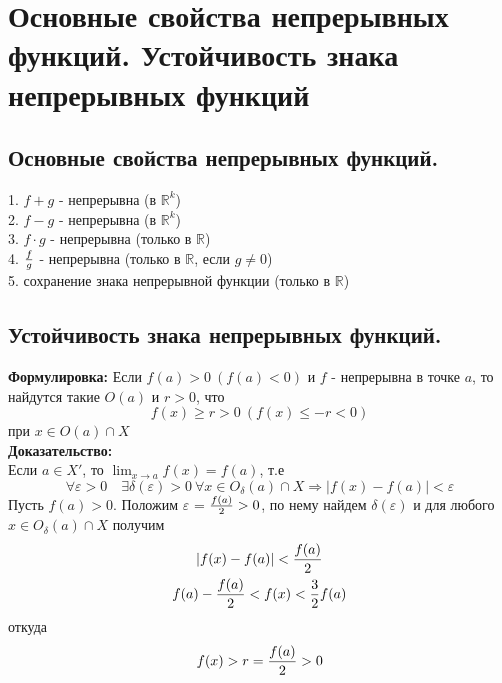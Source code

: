\section{Основные свойства непрерывных функций. Устойчивость знака непрерывных функций}
\subsection{Основные свойства непрерывных функций.}
1. $f + g$ - непрерывна (в $\mathbb{R}^{k}$)\\
2. $f - g$ - непрерывна (в $\mathbb{R}^{k}$)\\
3. $f \cdot g$ - непрерывна (только в $\mathbb{R}$)\\
4. $f \over g$ - непрерывна (только в $\mathbb{R}$, если $g \neq 0 $) \\
5. сохранение знака непрерывной функции (только в $\mathbb{R}$)

\subsection{Устойчивость знака непрерывных функций.}
\textbf{Формулировка:}
Если $f(a) > 0 \ (f(a) < 0 )$ и $f$ - непрерывна в точке $a$, то найдутся такие $O(a)$ и $r>0$, что\\
$$
	f(x) \geq r > 0 \ (f(x) \leq -r < 0)
$$
при $x \in O(a) \cap X$\\
\textbf{Доказательство:}\\
Если $a \in X'$, то $\lim_{x\to a}{f(x)} = f(a)$, т.е
$$
\forall \varepsilon>0 \quad \exists \delta(\varepsilon)>0 \ \forall x \in O_{\delta}(a) \cap X
\Rightarrow |f(x)- f(a)| < \varepsilon
$$
Пусть $f(a)>0$. Положим $\varepsilon$ = ${f(a)\over 2} > 0$, по нему найдем $\delta(\varepsilon)$ и для любого $x \in O_{\delta}(a) \cap X$ получим
\begin{equation*}
\begin{gathered}
|f(x) - f(a)| < {f(a)\over 2}\\
f(a) - {f(a)\over 2} < f(x) < {3\over 2} f(a)\\
\end{gathered}
\end{equation*}
откуда
$$
	f(x)> r = {f(a)\over 2} > 0
$$